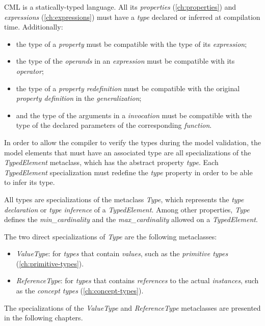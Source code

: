 CML is a statically-typed language.
All its \emph{properties} (\ref{ch:properties})
and \emph{expressions} (\ref{ch:expressions})
must have a \emph{type} declared or inferred at compilation time.
Additionally:

\begin{itemize}
\item the type of a \emph{property}
must be compatible with the type of its \emph{expression};
\item the type of the \emph{operands} in an \emph{expression}
must be compatible with its \emph{operator};
\item the type of a \emph{property redefinition} must be compatible with
the original \emph{property definition} in the \emph{generalization};
\item and the type of the arguments in a \emph{invocation}
must be compatible with the type of the declared parameters
of the corresponding \emph{function}.
\end{itemize}

In order to allow the compiler to verify the types during the model validation,
the model elements that must have an associated type
are all specializations of the \emph{TypedElement} metaclass,
which has the abstract property \emph{type}.
Each \emph{TypedElement} specialization must
redefine the \emph{type} property in order to be able to infer its type.

All types are specializations of the metaclass \emph{Type},
which represents the \emph{type declaration} or \emph{type inference}
of a \emph{TypedElement}.
Among other properties,
\emph{Type} defines the \emph{min\_cardinality} and the \emph{max\_cardinality}
allowed on a \emph{TypedElement}.

The two direct specializations of \emph{Type} are the following metaclasses:

\begin{itemize}
  \item \emph{ValueType}: for \emph{types} that contain \emph{values},
  such as the \emph{primitive types} (\ref{ch:primitive-types}).
  \item \emph{ReferenceType}: for \emph{types} that contains \emph{references}
  to the actual \emph{instances},
  such as the \emph{concept types} (\ref{ch:concept-types}).
\end{itemize}

The specializations of
the \emph{ValueType} and \emph{ReferenceType} metaclasses
are presented in the following chapters.
